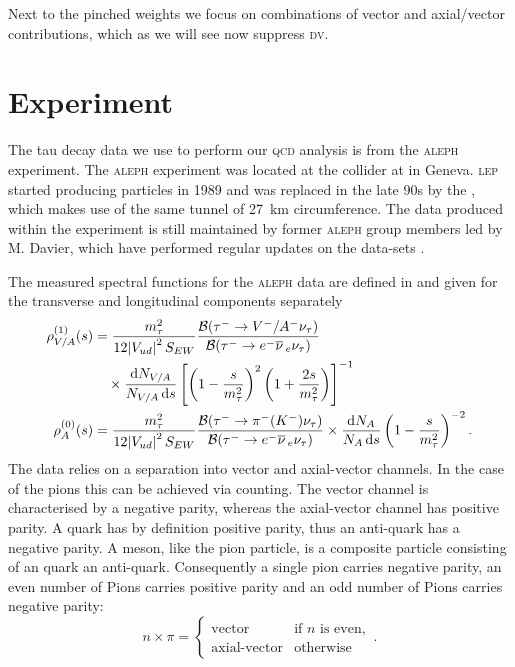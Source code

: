 \documentclass[../../index.tex]{subfiles}
\begin{document}
Next to the pinched weights we focus on combinations of vector and
axial\-/vector contributions, which as we will see now suppress \textsc{dv}.



\section{Experiment}
The tau decay data we use to perform our \textsc{qcd} analysis is from the
\textsc{aleph} experiment. The \textsc{aleph} experiment was located at the
 collider at  in Geneva. \textsc{lep} started producing
particles in 1989 and was replaced in the late 90s by the
, which makes use of the same tunnel of
\SI{27}{\kilo\meter} circumference. The data produced within the experiment is
still maintained by former \textsc{aleph} group members led by M. Davier,
which have performed regular updates on the data-sets
\cite{Davier2013,Davier2008,Aleph2005}.

The measured spectral functions for the \textsc{aleph} data are defined in
\cite{Davier2007} and given for the transverse and longitudinal components
separately
\begin{equation}
  \begin{split}
    \rho^{(1)}_{V/A}(s) &= \frac{m_\tau^2}{12 \abs{V_{ud}}^2S_{EW}} \frac{\mathcal{B}(\tau^- \to V^-/A^- \nu_\tau)}{\mathcal{B}(\tau^- \to e^- \anti{\nu}_e \nu_\tau)} \\
    &\quad\times \frac{\dif N_{V/A}}{N_{V/A}\dif s} \left[ \left( 1 - \frac{s}{m_\tau^2} \right)^2 \left( 1 + \frac{2s}{m_\tau^2} \right) \right]^{-1} \\
    \rho^{(0)}_{A}(s) &= \frac{m_\tau^2}{12 \abs{V_{ud}}^2 S_{EW}}
    \frac{\mathcal{B}(\tau^- \to \pi^-(K^-) \nu_\tau)}{\mathcal{B}(\tau^- \to
      e^- \anti{\nu}_e \nu_\tau)} \times \frac{\dif N_A}{N_A \dif s} \left( 1 -
      \frac{s}{m_\tau^2} \right)^{-2}.
  \end{split}
\end{equation}
The data relies on a separation into vector and axial-vector channels. In the
case of the pions this can be achieved via counting. The vector channel is
characterised by a negative parity, whereas the axial-vector channel has
positive parity. A quark has by definition positive parity, thus an anti-quark
has a negative parity. A meson, like the pion particle, is a composite particle
consisting of an quark an anti-quark. Consequently a single pion carries
negative parity, an even number of Pions carries positive parity and an odd
number of Pions carries negative parity:
\begin{equation}
  n \times \pi = \begin{cases} \mbox{vector} & \mbox{if } n \text{ is even}, \\ \mbox{axial-vector} & \mbox{otherwise} \end{cases}.
\end{equation}
\end{document}

